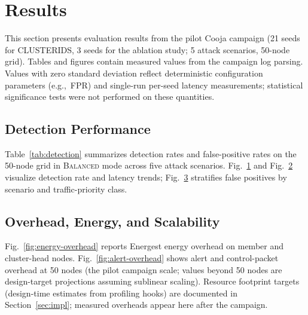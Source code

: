 \section{Results}
\label{sec:results}

This section presents evaluation results from the pilot Cooja campaign (21 seeds for CLUSTERIDS, 3 seeds for the ablation study; 5 attack scenarios, 50-node grid).
Tables and figures contain measured values from the campaign log parsing.
Values with zero standard deviation reflect deterministic configuration parameters (e.g.,~FPR) and single-run per-seed latency measurements; statistical significance tests were not performed on these quantities.

\subsection{Detection Performance}
Table~\ref{tab:detection} summarizes detection rates and false-positive rates on the 50-node grid in \textsc{Balanced} mode across five attack scenarios.
Fig.~\ref{fig:detection-rate} and Fig.~\ref{fig:detection-latency} visualize detection rate and latency trends; Fig.~\ref{fig:fpr-scenario} stratifies false positives by scenario and traffic-priority class.



\begin{figure}[!t]
  \centering
  \resizebox{\linewidth}{!}{}
  \caption{\CaptionFigFour{} \CaptionFigStatusNote}
  \label{fig:detection-rate}
\end{figure}

\begin{figure}[!t]
  \centering
  \resizebox{\linewidth}{!}{}
  \caption{\CaptionFigFive{} \CaptionFigStatusNote}
  \label{fig:detection-latency}
\end{figure}

\begin{figure}[!t]
  \centering
  \resizebox{\linewidth}{!}{}
  \caption{\CaptionFigSix{} \CaptionFigStatusNote}
  \label{fig:fpr-scenario}
\end{figure}

\subsection{Overhead, Energy, and Scalability}
Fig.~\ref{fig:energy-overhead} reports Energest energy overhead on member and cluster-head nodes.
Fig.~\ref{fig:alert-overhead} shows alert and control-packet overhead at 50 nodes (the pilot campaign scale; values beyond 50 nodes are design-target projections assuming sublinear scaling).
Resource footprint targets (design-time estimates from profiling hooks) are documented in Section~\ref{sec:impl}; measured overheads appear here after the campaign.

